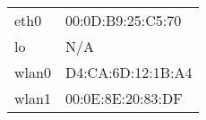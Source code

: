\begin{tabular}{ll}
eth0 & 00:0D:B9:25:C5:70\\
lo & N/A\\
wlan0 & D4:CA:6D:12:1B:A4\\
wlan1 & 00:0E:8E:20:83:DF\\
\end{tabular}

